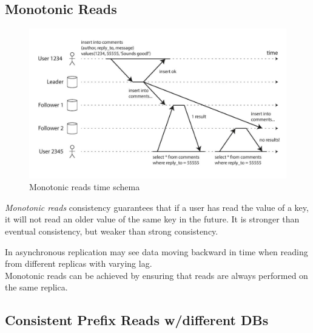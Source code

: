 \subsection{Monotonic Reads}

\begin{paracol}{2}
   \begin{figure}[htbp]
      \centering
      \includegraphics[width=0.95\columnwidth]{images/10/monotonic.png}
      \caption{Monotonic reads time schema}
      \label{fig:10/monotonic}
   \end{figure}
   
   
   \switchcolumn
   \colfill
   \textit{Monotonic reads} consistency guarantees that if a user has read the value of a key, it will not read an older value of the same key in the future.
   It is stronger than eventual consistency, but weaker than strong consistency.
   
   In asynchronous replication may see data moving backward in time when reading from different replicas with varying lag.\\
   Monotonic reads can be achieved by ensuring that reads are always performed on the same replica.
   \colfill
\end{paracol}


\newpage
\subsection{Consistent Prefix Reads w/different DBs}

